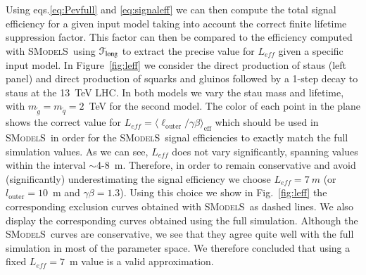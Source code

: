 \documentclass[preprint,number,sort&compress,twocolumn,3p]{elsstyarticle}
\newcommand{\smo}{\textsc{SModelS}}
\newcommand{\com}[1]{\emph{\color{red}[#1]}}  %
\begin{document}
\begin{appendix}
Using eqs.\ref{eq:Pevfull} and \ref{eq:signaleff} we can then compute the total signal efficiency for a given input model taking into account the correct finite lifetime suppression factor. This factor can then be compared to the efficiency computed with \smo\ using ${\cal F}_\mathrm{long}$
to extract the precise value for $L_{eff}$ given a specific input model.
In Figure~\ref{fig:leff} we consider the direct production of staus (left panel) and direct production of squarks and gluinos followed by a 1-step decay to staus at the 13~TeV LHC.
In both models we vary the stau mass and lifetime, with $m_{\tilde g} = m_{\tilde q} = 2$~TeV for the second model.
The color of each point in the plane
shows the correct value for $L_{eff} = \langle\ell_\text{outer}/\gamma\beta\rangle_\text{eff}$ 
which should be used in \smo\ in order for the \smo\ signal efficiencies to exactly match the full simulation values.
As we can see, $L_{eff}$ does not vary significantly, spanning values within the interval $\sim$4-8~m. Therefore, in order to remain conservative 
and avoid (significantly) underestimating the signal efficiency we choose $L_{eff} = 7~m$ (or $l_\text{outer} = 10$~m and $\gamma\beta = 1.3$). 
Using this choice we show in Fig.~\ref{fig:leff} the corresponding exclusion curves obtained with \smo\ as dashed lines. We also display the corresponding curves obtained using the full simulation. 
Although the \smo\ curves are conservative, we see that they agree quite well with the full simulation in most of the parameter space. We therefore concluded that using a fixed $L_{eff} = 7$~m value is a valid approximation.











\end{appendix}
\end{document}
